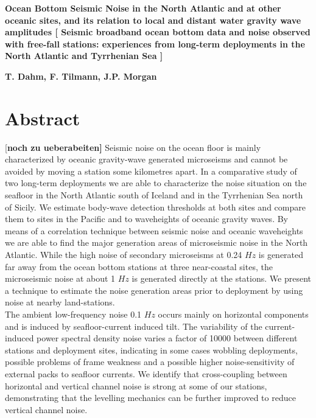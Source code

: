 \documentclass{article}
\providecommand{\remark}[1]{{[\bf #1]}}
\begin{document}
\begin{center}
{\Large\bf 
Ocean Bottom Seismic Noise in the North Atlantic and at other oceanic sites, 
and its relation to local and distant water gravity wave amplitudes
\remark{
Seismic broadband ocean bottom data and noise observed with
free-fall stations:
experiences from long-term deployments in the North Atlantic and Tyrrhenian Sea
}
}
\end{center}
{\bf T. Dahm, F. Tilmann, J.P. Morgan}
  
\section*{Abstract}
\remark{noch zu ueberabeiten}
Seismic noise on the ocean floor is mainly characterized by 
oceanic gravity-wave generated microseisms and cannot be avoided 
by moving a station some kilometres apart.
In a comparative study of two long-term deployments 
we are able to characterize the 
noise situation on the seafloor in the North Atlantic  south of Iceland 
and in the Tyrrhenian Sea north of Sicily.
We estimate body-wave detection  thresholds  at both sites  and compare them 
to sites in the Pacific and to waveheights of oceanic gravity waves.
By means of a correlation technique between seismic noise and 
oceanic waveheights we are able to find the major generation 
areas of microseismic noise in the North Atlantic.
While the high noise of secondary microseisms at 0.24 $Hz$ is 
generated far away from the ocean bottom stations 
at three near-coastal sites, 
the microseismic noise at about 1 $Hz$ is generated directly at the stations.
We present a technique to estimate the noise generation areas prior 
to deployment by using noise at nearby land-stations.
\\
The ambient low-frequency noise 0.1 $Hz$ occurs mainly on horizontal 
components and is induced by seafloor-current induced tilt.
The variability of the current-induced power spectral density noise
varies a factor of 10000 between different stations and deployment sites, 
indicating in some cases wobbling deployments, 
possible problems of frame weakness and 
a possible higher noise-sensitivity of external packs to 
seafloor currents.
We identify that cross-coupling between horizontal and vertical channel
noise is strong at some of our stations, 
demonstrating that the levelling mechanics can be further 
improved to reduce vertical channel noise.
\end{document}
